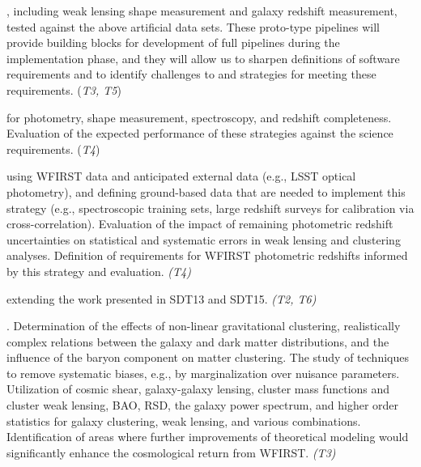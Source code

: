, including weak lensing
shape measurement and galaxy redshift measurement, tested against the
above artificial data sets.  These proto-type pipelines will provide
building blocks for development of full pipelines during the implementation
phase, and they will allow us to sharpen definitions of software
requirements and to identify challenges to and strategies for meeting
these requirements. (\textit{T3, T5})

 for photometry, shape measurement, spectroscopy,
and redshift completeness.  Evaluation of the expected performance of these
strategies against the science requirements. (\textit{T4})

using WFIRST data and anticipated external data (e.g., LSST optical
photometry), and defining ground-based data that are needed to
implement this strategy (e.g., spectroscopic training sets, large
redshift surveys for calibration via cross-correlation).
Evaluation of the impact of remaining photometric redshift uncertainties
on statistical and systematic errors in weak lensing and clustering analyses.
Definition of requirements for WFIRST photometric redshifts informed
by this strategy and evaluation. \textit{(T4)}

 extending the work presented in SDT13 and SDT15. \textit{(T2, T6)}

.
Determination of the effects of non-linear gravitational clustering, realistically complex relations between the
galaxy and dark matter distributions, and the influence of the baryon
component on matter clustering.
The study of techniques to
remove systematic biases, e.g., by marginalization over nuisance
parameters.
Utilization of cosmic shear,
galaxy-galaxy lensing, cluster mass functions and cluster weak lensing, BAO, RSD, the galaxy
power spectrum, and higher order statistics for galaxy clustering, weak
lensing, and various combinations.
Identification of areas where
further improvements of theoretical modeling would significantly
enhance the cosmological return from WFIRST. \textit{(T3)}

